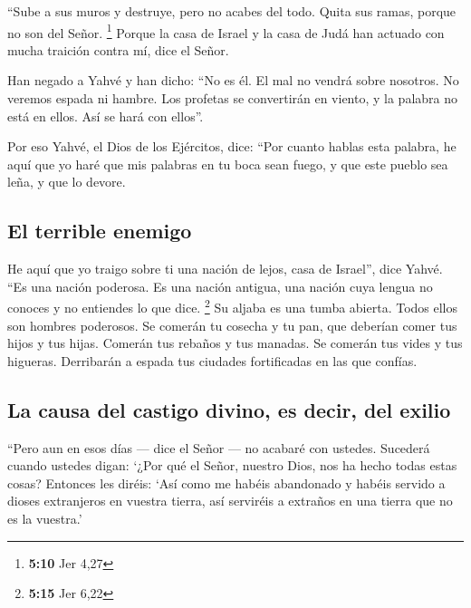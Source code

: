 \begin{paracol}{2}
 ``Sube a sus muros y destruye, pero no acabes del todo.
Quita sus ramas, porque no son del Señor. \footnote{\textbf{5:10} Jer
  4,27}  Porque la casa de Israel y la casa de Judá han
actuado con mucha traición contra mí, dice el Señor.

 Han negado a Yahvé y han dicho: ``No es él. El mal no
vendrá sobre nosotros. No veremos espada ni hambre.  Los
profetas se convertirán en viento, y la palabra no está en ellos. Así se
hará con ellos''.

 Por eso Yahvé, el Dios de los Ejércitos, dice: ``Por
cuanto hablas esta palabra, he aquí que yo haré que mis palabras en tu
boca sean fuego, y que este pueblo sea leña, y que lo devore.

\hypertarget{el-terrible-enemigo}{%
\subsection{El terrible enemigo}\label{el-terrible-enemigo}}

 He aquí que yo traigo sobre ti una nación de lejos, casa
de Israel'', dice Yahvé. ``Es una nación poderosa. Es una nación
antigua, una nación cuya lengua no conoces y no entiendes lo que dice.
\footnote{\textbf{5:15} Jer 6,22}  Su aljaba es una tumba
abierta. Todos ellos son hombres poderosos.  Se comerán
tu cosecha y tu pan, que deberían comer tus hijos y tus hijas. Comerán
tus rebaños y tus manadas. Se comerán tus vides y tus higueras.
Derribarán a espada tus ciudades fortificadas en las que confías.

\hypertarget{la-causa-del-castigo-divino-es-decir-del-exilio}{%
\subsection{La causa del castigo divino, es decir, del
exilio}\label{la-causa-del-castigo-divino-es-decir-del-exilio}}

 ``Pero aun en esos días --- dice el Señor --- no acabaré
con ustedes.  Sucederá cuando ustedes digan: `¿Por qué el
Señor, nuestro Dios, nos ha hecho todas estas cosas? Entonces les
diréis: `Así como me habéis abandonado y habéis servido a dioses
extranjeros en vuestra tierra, así serviréis a extraños en una tierra
que no es la vuestra.'

\hypertarget{la-ignorancia-del-pueblo-la-codicia-de-las-clases-altas-y-la-deshonestidad-del-clero}{%
}
\end{paracol}
